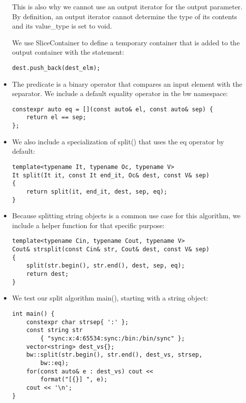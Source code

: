 \begin{itemize}
This is also why we cannot use an output iterator for the output parameter. By definition, an output iterator cannot determine the type of its contents and its value\_type is set to void.

We use SliceContainer to define a temporary container that is added to the output container with the statement:

\begin{lstlisting}[style=styleCXX]
dest.push_back(dest_elm);
\end{lstlisting}

\item 
The predicate is a binary operator that compares an input element with the separator. We include a default equality operator in the bw namespace:

\begin{lstlisting}[style=styleCXX]
constexpr auto eq = [](const auto& el, const auto& sep) {
	return el == sep;
};
\end{lstlisting}

\item 
We also include a specialization of split() that uses the eq operator by default:

\begin{lstlisting}[style=styleCXX]
template<typename It, typename Oc, typename V>
It split(It it, const It end_it, Oc& dest, const V& sep)
{
	return split(it, end_it, dest, sep, eq);
}
\end{lstlisting}

\item 
Because splitting string objects is a common use case for this algorithm, we include a helper function for that specific purpose:

\begin{lstlisting}[style=styleCXX]
template<typename Cin, typename Cout, typename V>
Cout& strsplit(const Cin& str, Cout& dest, const V& sep)
{
	split(str.begin(), str.end(), dest, sep, eq);
	return dest;
}
\end{lstlisting}

\item 
We test our split algorithm main(), starting with a string object:

\begin{lstlisting}[style=styleCXX]
int main() {
	constexpr char strsep{ ':' };
	const string str
		{ "sync:x:4:65534:sync:/bin:/bin/sync" };
	vector<string> dest_vs{};
	bw::split(str.begin(), str.end(), dest_vs, strsep,
		bw::eq);
	for(const auto& e : dest_vs) cout <<
		format("[{}] ", e);
	cout << '\n';
}
\end{lstlisting}


\end{itemize}
